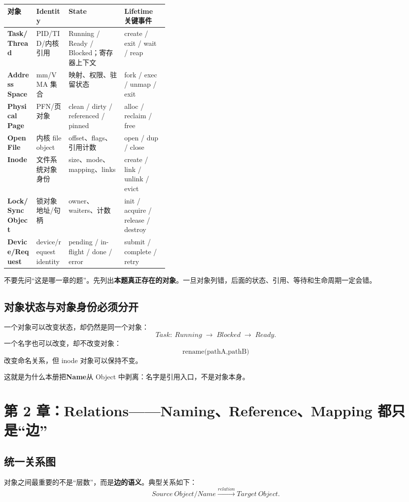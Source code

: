 \documentclass[11pt,a4paper]{ctexart}
\newcommand{\kw}[1]{\textbf{#1}}
\newcommand{\arr}{\;\longrightarrow\;}
\begin{document}
\begin{center}
\scriptsize
\begin{tabularx}{\linewidth}{>{\bfseries}p{0.18\linewidth} >{\raggedright\arraybackslash}p{0.20\linewidth} Y Y}
\toprule
对象 & Identity & State & Lifetime 关键事件 \\
\midrule
Task/Thread & PID/TID/内核引用 & Running / Ready / Blocked；寄存器上下文 & create / exit / wait / reap \\
Address Space & mm/VMA 集合 & 映射、权限、驻留状态 & fork / exec / unmap / exit \\
Physical Page & PFN/页对象 & clean / dirty / referenced / pinned & alloc / reclaim / free \\
Open File & 内核 file object & offset、flags、引用计数 & open / dup / close \\
Inode & 文件系统对象身份 & size、mode、mapping、links & create / link / unlink / evict \\
Lock/Sync Object & 锁对象地址/句柄 & owner、waiters、计数 & init / acquire / release / destroy \\
Device/Request & device/request identity & pending / in-flight / done / error & submit / complete / retry \\
\bottomrule
\end{tabularx}
\end{center}

\begin{method}[跨专题第一问]
不要先问“这是哪一章的题”。先列出\kw{本题真正存在的对象}。一旦对象列错，后面的状态、引用、等待和生命周期一定会错。
\end{method}

\subsection{对象状态与对象身份必须分开}
一个对象可以改变状态，却仍然是同一个对象：
\[
Task:\ Running\arr Blocked\arr Ready.
\]
一个名字也可以改变，却不改变对象：
\[
\text{rename(pathA,pathB)}
\]
改变命名关系，但 inode 对象可以保持不变。

这就是为什么本册把\kw{Name}从 Object 中剥离：名字是引用入口，不是对象本身。

\section{第 2 章：Relations——Naming、Reference、Mapping 都只是“边”}

\subsection{统一关系图}
对象之间最重要的不是“层数”，而是\kw{边的语义}。典型关系如下：
\[
\boxed{Source\ Object/Name\xrightarrow{relation}Target\ Object}.
\]
\end{document}

